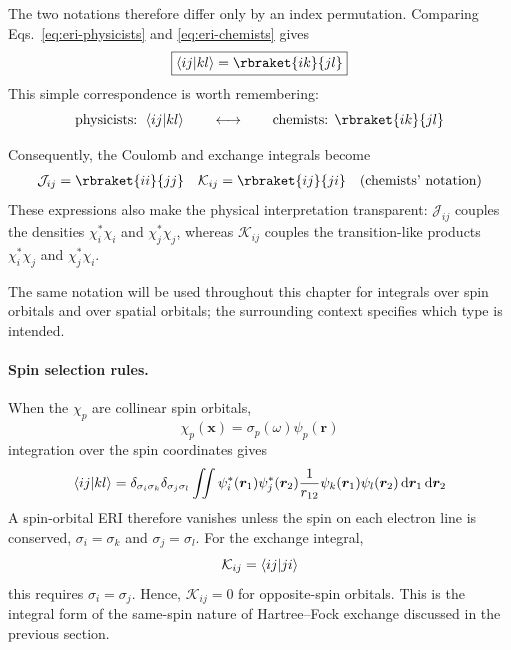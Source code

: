 \documentclass[11pt,a4paper,titlepage]{article}
\numberwithin{equation}{section}
\newcommand{\br}{\boldsymbol{r}}
\newcommand{\bx}{\boldsymbol{x}}
\newcommand{\cJ}{\mathcal{J}}
\newcommand{\cK}{\mathcal{K}}
\begin{document}
The two notations therefore differ only by an index permutation. Comparing
Eqs.~\eqref{eq:eri-physicists} and \eqref{eq:eri-chemists} gives
\begin{equation}
  \boxed{
  \braket{ij}{kl}
  =
  \rbraket{ik}{jl}
  }
  \label{eq:phys-chem-map}
\end{equation}
This simple correspondence is worth remembering:
\begin{equation}
  \text{physicists: }\braket{ij}{kl}
  \qquad\longleftrightarrow\qquad
  \text{chemists: }\rbraket{ik}{jl}
\end{equation}

Consequently, the Coulomb and exchange integrals become
\begin{align}
  \cJ_{ij}
  &=
  \rbraket{ii}{jj}
  &
  \cK_{ij}
  &=
  \rbraket{ij}{ji}
  &
  \text{(chemists' notation)}
\end{align}
These expressions also make the physical interpretation transparent:
$\cJ_{ij}$ couples the densities $\chi_i^*\chi_i$ and
$\chi_j^*\chi_j$, whereas $\cK_{ij}$ couples the transition-like products
$\chi_i^*\chi_j$ and $\chi_j^*\chi_i$.

The same notation will be used throughout this chapter for integrals over
spin orbitals and over spatial orbitals; the surrounding context specifies
which type is intended.

\paragraph{Spin selection rules.}

When the $\chi_p$ are collinear spin orbitals,
\begin{equation}
  \chi_p(\bx)
  =
  \sigma_p(\omega)\psi_p(\br)
\end{equation}
integration over the spin coordinates gives
\begin{equation}
  \braket{ij}{kl}
  =
  \delta_{\sigma_i\sigma_k}
  \delta_{\sigma_j\sigma_l}
  \iint
  \psi_i^*(\br_1)
  \psi_j^*(\br_2)
  \frac{1}{r_{12}}
  \psi_k(\br_1)
  \psi_l(\br_2)
  \dd{\br_1}\dd{\br_2}
\end{equation}
A spin-orbital ERI therefore vanishes unless the spin on each electron line
is conserved,
  $\sigma_i=\sigma_k$
  and
  $\sigma_j=\sigma_l$.
For the exchange integral,
\begin{equation}
  \cK_{ij}=\braket{ij}{ji}
\end{equation}
this requires $\sigma_i=\sigma_j$. Hence,
  $\cK_{ij}=0$
  for opposite-spin orbitals.
This is the integral form of the same-spin nature of Hartree--Fock exchange
discussed in the previous section.
\end{document}
